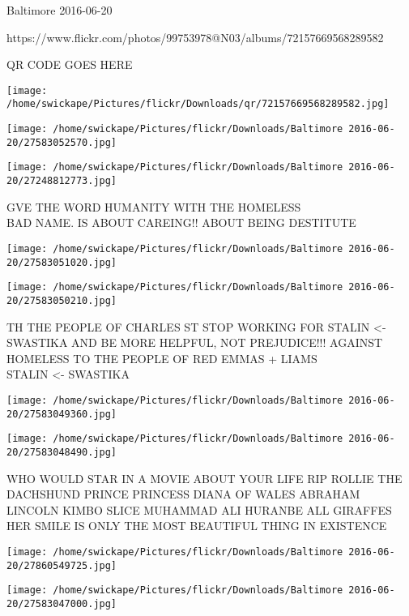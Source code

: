 \documentclass[10pt,letterpaper]{article}
\begin{document}
Baltimore 2016-06-20

https://www.flickr.com/photos/99753978@N03/albums/72157669568289582

QR CODE GOES HERE

\texttt{[image: /home/swickape/Pictures/flickr/Downloads/qr/72157669568289582.jpg]}
\pagebreak

\texttt{[image: /home/swickape/Pictures/flickr/Downloads/Baltimore 2016-06-20/27583052570.jpg]}

\vspace{0.25in}
\texttt{[image: /home/swickape/Pictures/flickr/Downloads/Baltimore 2016-06-20/27248812773.jpg]}

GVE THE WORD HUMANITY WITH THE HOMELESS\\
BAD NAME.  IS ABOUT CAREING!! ABOUT BEING DESTITUTE\\
\pagebreak

\texttt{[image: /home/swickape/Pictures/flickr/Downloads/Baltimore 2016-06-20/27583051020.jpg]}

\vspace{0.25in}
\texttt{[image: /home/swickape/Pictures/flickr/Downloads/Baltimore 2016-06-20/27583050210.jpg]}

TH THE PEOPLE OF CHARLES ST STOP WORKING FOR STALIN <{-} SWASTIKA AND BE MORE HELPFUL, NOT PREJUDICE!!! AGAINST HOMELESS TO THE PEOPLE OF RED EMMAS + LIAMS\\
STALIN <{-} SWASTIKA\\
\pagebreak

\texttt{[image: /home/swickape/Pictures/flickr/Downloads/Baltimore 2016-06-20/27583049360.jpg]}

\vspace{0.25in}
\texttt{[image: /home/swickape/Pictures/flickr/Downloads/Baltimore 2016-06-20/27583048490.jpg]}

WHO WOULD STAR IN A MOVIE ABOUT YOUR LIFE RIP ROLLIE THE DACHSHUND PRINCE PRINCESS DIANA OF WALES ABRAHAM LINCOLN KIMBO SLICE MUHAMMAD ALI HURANBE ALL GIRAFFES\\
HER SMILE IS ONLY THE MOST BEAUTIFUL THING IN  EXISTENCE\\
\pagebreak

\texttt{[image: /home/swickape/Pictures/flickr/Downloads/Baltimore 2016-06-20/27860549725.jpg]}

\vspace{0.25in}
\texttt{[image: /home/swickape/Pictures/flickr/Downloads/Baltimore 2016-06-20/27583047000.jpg]}
\end{document}
